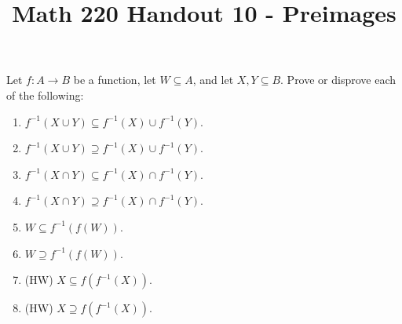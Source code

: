 \documentclass[12pt, reqno]{amsart}
\begin{document}
\title[Math 220 Handout 10 - Preimages]{Math 220 Handout 10  - Preimages}\maketitle


  Let $f\colon A \to B$ be a function, let $W \subseteq A$, and let $X,Y \subseteq B$. Prove
  or disprove each of the following:  
\begin{enumerate}
  \item $f^{-1}(X \cup Y) \subseteq f^{-1}(X) \cup f^{-1}(Y)$.
  \item $f^{-1}(X \cup Y) \supseteq f^{-1}(X) \cup f^{-1}(Y)$.
  \item $f^{-1}(X \cap Y) \subseteq f^{-1}(X) \cap f^{-1}(Y)$.
  \item $f^{-1}(X \cap Y) \supseteq f^{-1}(X) \cap f^{-1}(Y)$.
  \item $W \subseteq f^{-1}(f(W))$.
  \item $W \supseteq f^{-1}(f(W))$.
  \item (HW) $X \subseteq f(f^{-1}(X))$.
  \item (HW) $X \supseteq f(f^{-1}(X))$.
\end{enumerate}  
\end{document}
